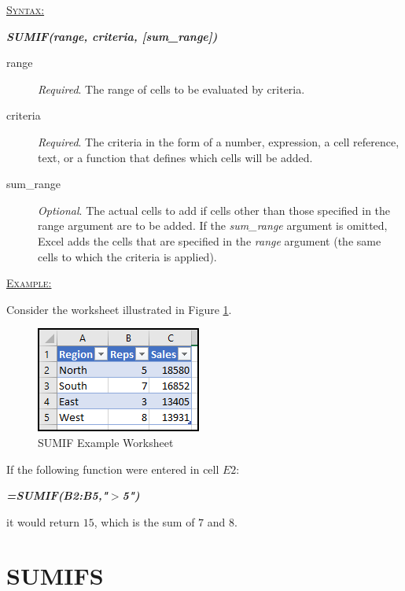 \begin{addmargin}[1cm]{0cm}
	
	\medskip
	\underline{\textsc{Syntax:}}
	\medskip
	
	{\color{Syntax}
		\noindent\textbf{\textit{SUMIF(range, criteria, [sum\_range])}}
	}
	
	\begin{description}
		\item[range] \textit{Required}. The range of cells to be evaluated by criteria. 
		\item[criteria] \textit{Required}. The criteria in the form of a number, expression, a cell reference, text, or a function that defines which cells will be added.
		\item[sum\_range] \textit{Optional}. The actual cells to add if cells other than those specified in the range argument are to be added. If the \textit{sum\_range} argument is omitted, Excel adds the cells that are specified in the \textit{range} argument (the same cells to which the criteria is applied).
	\end{description}

	\medskip
	\noindent\underline{\textsc{Example:}}
	\medskip
	
	\noindent Consider the worksheet illustrated in Figure \ref{apa:sif}.
	
	\begin{figure}[H]
		\centering
		\includegraphics[width=\maxwidth{.45\linewidth}]{gfx/apa_fig01}
		\caption{SUMIF Example Worksheet}
		\label{apa:sif}
	\end{figure}
	
	\noindent If the following function were entered in cell $ E2 $:
	
	{\color{Syntax}
		\textit{\textbf{=SUMIF(B2:B5,"$ > $5")}}
	}
	
	\noindent it would return $ 15 $, which is the sum of $ 7 $ and $ 8 $.

\end{addmargin}

\section{SUMIFS}

